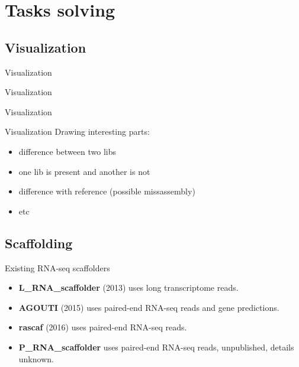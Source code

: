 \documentclass{beamer}
\newcommand{\cimg}[2]{%
	\begin{center}%
		\ifthenelse{\equal{#2}{}}{%
			\texttt{[image: \#1]}
		}{%
			\texttt{[image: \#1]}
		}%
	\end{center}%
}
\begin{document}
\section{Tasks solving}
\subsection{Visualization}

\begin{frame}[t]{Visualization}
\cimg{pic/examp.jpg}{0.8}
\end{frame}

\begin{frame}[t]{Visualization}
\cimg{pic/diflib.png}{1.03}
\end{frame}

\begin{frame}[t]{Visualization}
\cimg{pic/alongChr.png}{1}
\end{frame}

\begin{frame}[t]{Visualization}
Drawing interesting parts:
\begin{itemize}
	\item difference between two libs 
	\item one lib is present and another is not
	\item difference with reference (possible missassembly)
	\item etc
\end{itemize}
\end{frame}

\subsection{Scaffolding}

\begin{frame}[t]{Existing RNA-seq scaffolders}
	\begin{itemize}
		\item {\bf L\_RNA\_scaffolder} (2013) uses long transcriptome reads.
		\item {\bf AGOUTI} (2015) uses paired-end RNA-seq reads and gene predictions.
		\item {\bf rascaf} (2016) uses paired-end RNA-seq reads.
		\item {\bf P\_RNA\_scaffolder} uses paired-end RNA-seq reads, unpublished, details unknown. 
	\end{itemize}
	
	\printbibliography
			
\end{frame}
\end{document}

